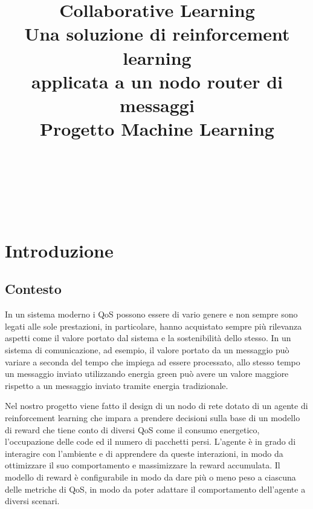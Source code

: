 \documentclass[conference]{IEEEtran}
\begin{document}
\let\subsectionautorefname\sectionautorefname
\let\subsubsectionautorefname\sectionautorefname
\title{Collaborative Learning\\ \large Una soluzione di reinforcement learning\\ applicata a un nodo router di messaggi\\
{\footnotesize Progetto Machine Learning}
}
\author{
 \\
\and
{}
 \\
\and
{}
 \\
}

\newcommand{\code}[1]{\texttt{#1}}

\maketitle
\thispagestyle{plain}
\pagestyle{plain}

\begin{abstract}
\end{abstract}

\section{Introduzione}
\subsection{Contesto}
In un sistema moderno i QoS possono essere di vario genere e non sempre sono legati alle sole prestazioni, in particolare, hanno acquistato sempre più rilevanza aspetti come il valore portato dal sistema e la sostenibilità dello stesso. In un sistema di comunicazione, ad esempio, il valore portato da un messaggio può variare a seconda del tempo che impiega ad essere processato, allo stesso tempo un messaggio inviato utilizzando energia green può avere un valore maggiore rispetto a un messaggio inviato tramite energia tradizionale.

Nel nostro progetto viene fatto il design di un nodo di rete dotato di un agente di reinforcement learning che impara a prendere decisioni sulla base di un modello di reward che tiene conto di diversi QoS come il consumo energetico, l'occupazione delle code ed il numero di pacchetti persi. L'agente è in grado di interagire con l'ambiente e di apprendere da queste interazioni, in modo da ottimizzare il suo comportamento e massimizzare la reward accumulata. Il modello di reward è configurabile in modo da dare più o meno peso a ciascuna delle metriche di QoS, in modo da poter adattare il comportamento dell'agente a diversi scenari.
\end{document}
